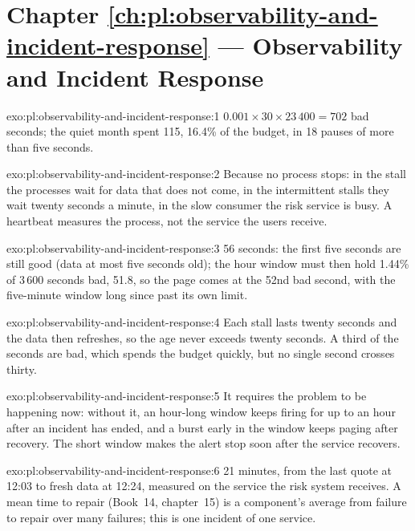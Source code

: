 \section*{Chapter \ref{ch:pl:observability-and-incident-response} --- Observability and Incident Response}

\begin{solution}{exo:pl:observability-and-incident-response:1}
$0.001 \times 30 \times 23\,400 = 702$ bad seconds; the quiet month spent 115, 16.4\% of the budget, in 18 pauses of more than five seconds.
\end{solution}

\begin{solution}{exo:pl:observability-and-incident-response:2}
Because no process stops: in the stall the processes wait for data that does not come, in the intermittent stalls they wait twenty seconds a
minute, in the slow consumer the risk service is busy. A heartbeat measures the process, not the service the users receive.
\end{solution}

\begin{solution}{exo:pl:observability-and-incident-response:3}
56 seconds: the first five seconds are still good (data at most five seconds old); the hour window must then hold 1.44\% of 3\,600 seconds bad,
51.8, so the page comes at the 52nd bad second, with the five-minute window long since past its own limit.
\end{solution}

\begin{solution}{exo:pl:observability-and-incident-response:4}
Each stall lasts twenty seconds and the data then refreshes, so the age never exceeds twenty seconds. A third of the seconds are bad, which
spends the budget quickly, but no single second crosses thirty.
\end{solution}

\begin{solution}{exo:pl:observability-and-incident-response:5}
It requires the problem to be happening now: without it, an hour-long window keeps firing for up to an hour after an incident has ended, and a
burst early in the window keeps paging after recovery. The short window makes the alert stop soon after the service recovers.
\end{solution}

\begin{solution}{exo:pl:observability-and-incident-response:6}
21 minutes, from the last quote at 12:03 to fresh data at 12:24, measured on the service the risk system receives. A mean time to repair
(Book~14, chapter~15) is a component's average from failure to repair over many failures; this is one incident of one service.
\end{solution}

